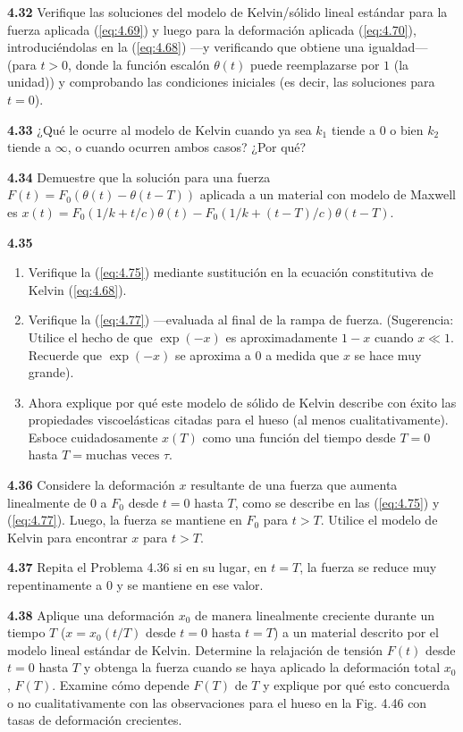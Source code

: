 \documentclass[12pt]{book}
\begin{document}
\textbf{4.32} Verifique las soluciones del modelo de Kelvin/sólido lineal estándar para la fuerza aplicada (\ref{eq:4.69}) y luego para la deformación aplicada (\ref{eq:4.70}), introduciéndolas en la (\ref{eq:4.68}) ---y verificando que obtiene una igualdad--- (para $t > 0$, donde la función escalón $\theta(t)$ puede reemplazarse por $1$ (la unidad)) y comprobando las condiciones iniciales (es decir, las soluciones para $t = 0$).

\textbf{4.33} ¿Qué le ocurre al modelo de Kelvin cuando ya sea $k_1$ tiende a $0$ o bien $k_2$ tiende a $\infty$, o cuando ocurren ambos casos? ¿Por qué?

\textbf{4.34} Demuestre que la solución para una fuerza $F(t) = F_0(\theta(t) - \theta(t - T))$ aplicada a un material con modelo de Maxwell es $x(t) = F_0(1/k + t/c)\theta(t) - F_0(1/k + (t - T)/c)\theta(t - T)$.

\textbf{4.35}
\begin{enumerate}
  \item[(a)] Verifique la (\ref{eq:4.75}) mediante sustitución en la ecuación constitutiva de Kelvin (\ref{eq:4.68}).
  \item[(b)] Verifique la (\ref{eq:4.77}) ---evaluada al final de la rampa de fuerza. (Sugerencia: Utilice el hecho de que $\exp(-x)$ es aproximadamente $1 - x$ cuando $x \ll 1$. Recuerde que $\exp(-x)$ se aproxima a $0$ a medida que $x$ se hace muy grande).
  \item[(c)] Ahora explique por qué este modelo de sólido de Kelvin describe con éxito las propiedades viscoelásticas citadas para el hueso (al menos cualitativamente). Esboce cuidadosamente $x(T)$ como una función del tiempo desde $T = 0$ hasta $T = \text{muchas veces } \tau$.
\end{enumerate}

\textbf{4.36} Considere la deformación $x$ resultante de una fuerza que aumenta linealmente de $0$ a $F_0$ desde $t = 0$ hasta $T$, como se describe en las (\ref{eq:4.75}) y (\ref{eq:4.77}). Luego, la fuerza se mantiene en $F_0$ para $t > T$. Utilice el modelo de Kelvin para encontrar $x$ para $t > T$.

\textbf{4.37} Repita el Problema 4.36 si en su lugar, en $t = T$, la fuerza se reduce muy repentinamente a $0$ y se mantiene en ese valor.

\textbf{4.38} Aplique una deformación $x_0$ de manera linealmente creciente durante un tiempo $T$ ($x = x_0(t/T)$ desde $t = 0$ hasta $t = T$) a un material descrito por el modelo lineal estándar de Kelvin. Determine la relajación de tensión $F(t)$ desde $t = 0$ hasta $T$ y obtenga la fuerza cuando se haya aplicado la deformación total $x_0$, $F(T)$. Examine cómo depende $F(T)$ de $T$ y explique por qué esto concuerda o no cualitativamente con las observaciones para el hueso en la Fig. 4.46 con tasas de deformación crecientes.
\end{document}

